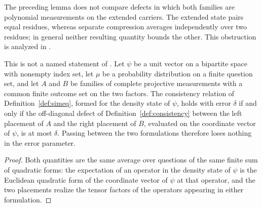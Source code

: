 \begin{remark}
	The preceding lemma does not compare defects in which both families are
	polynomial measurements on the extended carriers. The extended state
	pairs equal residues, whereas separate compression averages independently
	over two residues; in general neither resulting quantity bounds the other.
	This obstruction is analyzed in
	\cite{gap:qpbt_ld-dimension-divisibility}.
\end{remark}

\begin{lemma}
	\label{lem:direct-ld-consistency-defect-equivalence}
	\leanok
	This is not a named statement of \cite{Ji2020MIPStar}. Let $\psi$ be a unit
	vector on a bipartite space with nonempty index set, let $\mu$ be a
	probability distribution on a finite question set, and let $A$ and $B$ be
	families of complete projective measurements with a common finite outcome set
	on the two factors. The consistency relation of Definition~\ref{def:simeq},
	formed for the density state of $\psi$, holds with error $\delta$ if and only
	if the off-diagonal defect of Definition~\ref{def:consistency} between the
	left placement of $A$ and the right placement of $B$, evaluated on the
	coordinate vector of $\psi$, is at most $\delta$. Passing between the two
	formulations therefore loses nothing in the error parameter.
\end{lemma}
\begin{proof}
	\leanok
	Both quantities are the same average over questions of the same finite sum of
	quadratic forms: the expectation of an operator in the density state of
	$\psi$ is the Euclidean quadratic form of the coordinate vector of $\psi$ at
	that operator, and the two placements realize the tensor factors of the
	operators appearing in either formulation.
\end{proof}


